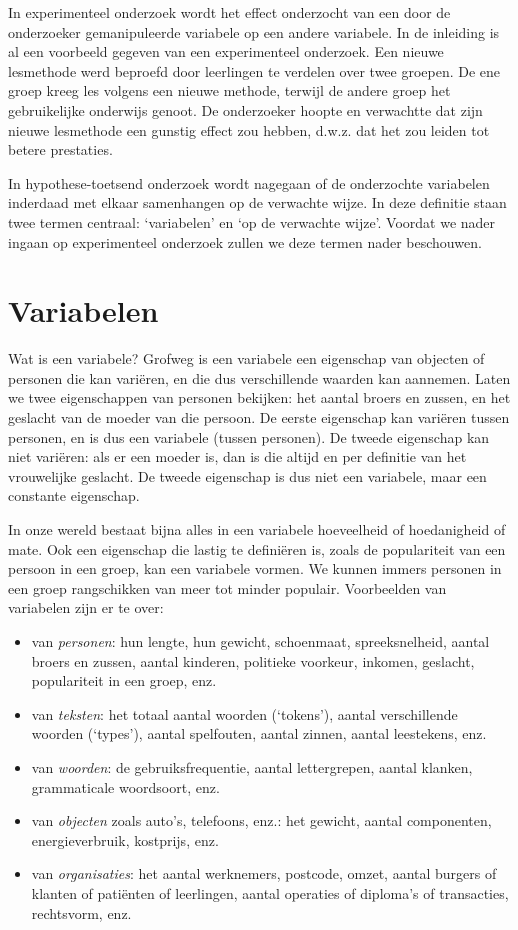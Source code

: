\documentclass[
]{book}
\begin{document}
In experimenteel onderzoek wordt het effect onderzocht van een door de
onderzoeker gemanipuleerde variabele op een andere variabele. In de
inleiding is al een voorbeeld gegeven van een experimenteel onderzoek.
Een nieuwe lesmethode werd beproefd door leerlingen te verdelen over
twee groepen. De ene groep kreeg les volgens een nieuwe methode, terwijl
de andere groep het gebruikelijke onderwijs genoot. De onderzoeker
hoopte en verwachtte dat zijn nieuwe lesmethode een gunstig effect zou
hebben, d.w.z. dat het zou leiden tot betere prestaties.

In hypothese-toetsend onderzoek wordt nagegaan of de onderzochte
variabelen inderdaad met elkaar samenhangen op de verwachte wijze. In
deze definitie staan twee termen centraal: `variabelen' en `op de
verwachte wijze'. Voordat we nader ingaan op experimenteel onderzoek
zullen we deze termen nader beschouwen.

\hypertarget{sec:variabelen}{%
\section{Variabelen}\label{sec:variabelen}}

Wat is een variabele? Grofweg is een variabele een eigenschap van
objecten of personen die kan variëren, en die dus verschillende waarden
kan aannemen. Laten we twee eigenschappen van personen bekijken: het
aantal broers en zussen, en het geslacht van de moeder van die persoon.
De eerste eigenschap kan variëren tussen personen, en is dus een
variabele (tussen personen). De tweede eigenschap kan niet variëren: als
er een moeder is, dan is die altijd en per definitie van het vrouwelijke
geslacht. De tweede eigenschap is dus niet een variabele, maar een
constante eigenschap.

In onze wereld bestaat bijna alles in een variabele hoeveelheid of
hoedanigheid of mate. Ook een eigenschap die lastig te definiëren is,
zoals de populariteit van een persoon in een groep, kan een variabele
vormen. We kunnen immers personen in een groep rangschikken van meer tot
minder populair. Voorbeelden van variabelen zijn er te over:

\begin{itemize}
\item
  van \emph{personen}: hun lengte, hun gewicht, schoenmaat, spreeksnelheid,
  aantal broers en zussen, aantal kinderen, politieke voorkeur,
  inkomen, geslacht, populariteit in een groep, enz.
\item
  van \emph{teksten}: het totaal aantal woorden (`tokens'), aantal
  verschillende woorden (`types'), aantal spelfouten, aantal zinnen,
  aantal leestekens, enz.
\item
  van \emph{woorden}: de gebruiksfrequentie, aantal lettergrepen, aantal
  klanken, grammaticale woordsoort, enz.
\item
  van \emph{objecten} zoals auto's, telefoons, enz.: het gewicht, aantal
  componenten, energieverbruik, kostprijs, enz.
\item
  van \emph{organisaties}: het aantal werknemers, postcode, omzet, aantal
  burgers of klanten of patiënten of leerlingen, aantal operaties of
  diploma's of transacties, rechtsvorm, enz.
\end{itemize}
\end{document}
